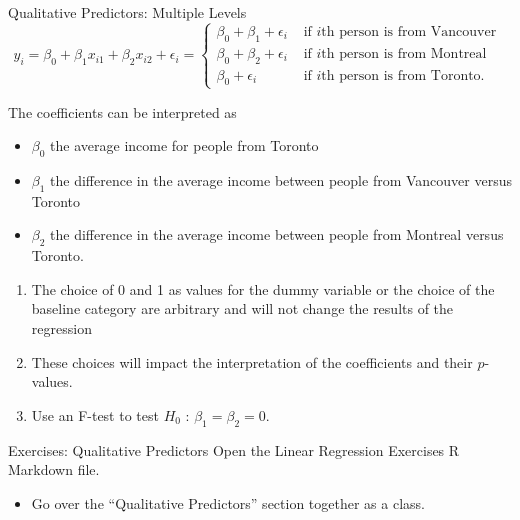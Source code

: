 \documentclass[
  ignorenonframetext,
  aspectratio=169,
]{beamer}
\providecommand{\tightlist}{%
  \setlength{\itemsep}{0pt}\setlength{\parskip}{0pt}}\usepackage{longtable,booktabs,array}
\begin{document}
\begin{frame}{Qualitative Predictors: Multiple Levels}
\protect\hypertarget{qualitative-predictors-multiple-levels}{}
\[
y_{i}=\beta_{0}+\beta_{1} x_{i 1}+\beta_{2} x_{i 2}+\epsilon_{i}=\left\{\begin{array}{ll}
\beta_{0}+\beta_{1}+\epsilon_{i} & \text { if } i \text{th person is from Vancouver } \\
\beta_{0}+\beta_{2}+\epsilon_{i} & \text { if } i \text{th person is from Montreal } \\
\beta_{0}+\epsilon_{i} & \text { if } i \text{th person is from Toronto. }
\end{array}\right.
\]

The coefficients can be interpreted as

\begin{itemize}
\item
  \(\beta_0\) the average income for people from Toronto
\item
  \(\beta_1\) the difference in the average income between people from
  Vancouver versus Toronto
\item
  \(\beta_2\) the difference in the average income between people from
  Montreal versus Toronto.
\end{itemize}

\begin{enumerate}
\tightlist
\item
  The choice of 0 and 1 as values for the dummy variable or the choice
  of the baseline category are arbitrary and will not change the results
  of the regression
\item
  These choices will impact the interpretation of the coefficients and
  their \(p\)-values.
\item
  Use an F-test to test \(H_0\) : \(\beta_1 = \beta_2 = 0\).
\end{enumerate}
\end{frame}

\begin{frame}{Exercises: Qualitative Predictors}
\protect\hypertarget{exercises-qualitative-predictors}{}
Open the Linear Regression Exercises R Markdown file.

\begin{itemize}
\tightlist
\item
  Go over the ``Qualitative Predictors'' section together as a class.
\end{itemize}
\end{frame}
\end{document}
